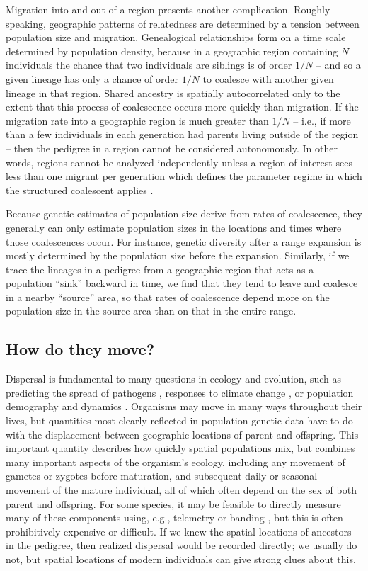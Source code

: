 \documentclass{ar-1col}
\begin{document}
Migration into and out of a region presents another complication.
Roughly speaking,
geographic patterns of relatedness
are determined by a tension between population size and migration.
Genealogical relationships form on a time scale determined by population density,
because in a geographic region containing $N$ individuals
the chance that two individuals are siblings is of order $1/N$ --
and so
a given lineage has only a chance of order $1/N$ to coalesce 
with another given lineage in that region.
Shared ancestry is spatially autocorrelated
only to the extent that this process of coalescence
occurs more quickly than migration.
If the migration rate into a geographic region is much greater than $1/N$ --
i.e., if more than a few individuals in each generation had parents living outside of the region --
then the pedigree in a region cannot be considered autonomously.
In other words,
regions cannot be analyzed independently
unless a region of interest sees less than one migrant per generation
which defines the parameter regime in which the structured coalescent applies \citep{nagylaki1998}.

Because genetic estimates of population size 
derive from rates of coalescence,
they generally can only estimate population sizes 
in the locations and times where those coalescences occur.
For instance, genetic diversity after a range expansion 
is mostly determined by the population size before the expansion.
Similarly, if we trace the lineages in a pedigree 
from a geographic region that acts as a population ``sink'' backward in time, 
we find that they tend to leave and coalesce in a nearby ``source'' area,
so that rates of coalescence depend more on the population size in the source area
than on that in the entire range.

\subsection{How do they move?}

Dispersal is fundamental to many questions in ecology and evolution,
such as
predicting the spread of pathogens \citep{BiekReal2010},
responses to climate change \citep{parmesan2006},
or population demography and dynamics \citep{schreiber2010interactive}.
Organisms may move in many ways throughout their lives,
but quantities most clearly reflected in population genetic data
have to do with the displacement between geographic locations of parent and offspring.
This important quantity describes how quickly spatial populations mix,
but combines many important aspects of the organism's ecology, including
any movement of gametes or zygotes before maturation,
and subsequent daily or seasonal movement of the mature individual,
all of which often depend on the sex of both parent and offspring.
For some species,
it may be feasible to directly measure many of these components
using, e.g., telemetry or banding \citep{Cayuela2018demographic},
but this is often prohibitively expensive or difficult.
If we knew the spatial locations of ancestors in the pedigree,
then realized dispersal would be recorded directly;
we usually do not, but spatial locations of modern individuals
can give strong clues about this.
\end{document}
